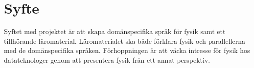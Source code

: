 \documentclass[12pt,a4paper]{article}
\begin{document}
%
%
%
%
%
%

\section{Syfte}

Syftet med projektet är att skapa domänspecifika språk för fysik samt ett
tillhörande läromaterial. Läromaterialet ska både förklara fysik och
parallellerna med de domänspecifika språken. Förhoppningen är att väcka intresse
för fysik hos datateknologer genom att presentera fysik från ett annat
perspektiv.

%
\end{document}
